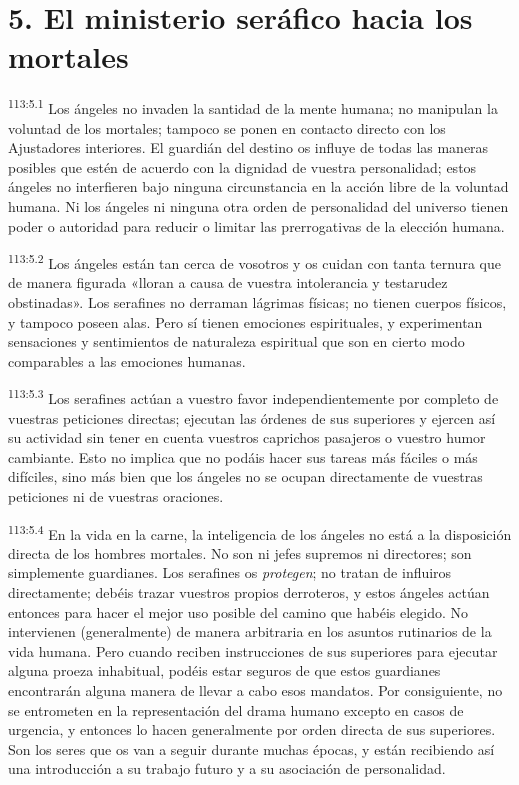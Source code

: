 \section*{5. El ministerio seráfico hacia los mortales}
\par
\textsuperscript{113:5.1} Los ángeles no invaden la santidad de la mente humana; no manipulan la voluntad de los mortales; tampoco se ponen en contacto directo con los Ajustadores interiores. El guardián del destino os influye de todas las maneras posibles que estén de acuerdo con la dignidad de vuestra personalidad; estos ángeles no interfieren bajo ninguna circunstancia en la acción libre de la voluntad humana. Ni los ángeles ni ninguna otra orden de personalidad del universo tienen poder o autoridad para reducir o limitar las prerrogativas de la elección humana.

\par
\textsuperscript{113:5.2} Los ángeles están tan cerca de vosotros y os cuidan con tanta ternura que de manera figurada «lloran a causa de vuestra intolerancia y testarudez obstinadas». Los serafines no derraman lágrimas físicas; no tienen cuerpos físicos, y tampoco poseen alas. Pero sí tienen emociones espirituales, y experimentan sensaciones y sentimientos de naturaleza espiritual que son en cierto modo comparables a las emociones humanas.

\par
\textsuperscript{113:5.3} Los serafines actúan a vuestro favor independientemente por completo de vuestras peticiones directas; ejecutan las órdenes de sus superiores y ejercen así su actividad sin tener en cuenta vuestros caprichos pasajeros o vuestro humor cambiante. Esto no implica que no podáis hacer sus tareas más fáciles o más difíciles, sino más bien que los ángeles no se ocupan directamente de vuestras peticiones ni de vuestras oraciones.

\par
\textsuperscript{113:5.4} En la vida en la carne, la inteligencia de los ángeles no está a la disposición directa de los hombres mortales. No son ni jefes supremos ni directores; son simplemente guardianes. Los serafines os \textit{protegen}; no tratan de influiros directamente; debéis trazar vuestros propios derroteros, y estos ángeles actúan entonces para hacer el mejor uso posible del camino que habéis elegido. No intervienen (generalmente) de manera arbitraria en los asuntos rutinarios de la vida humana. Pero cuando reciben instrucciones de sus superiores para ejecutar alguna proeza inhabitual, podéis estar seguros de que estos guardianes encontrarán alguna manera de llevar a cabo esos mandatos. Por consiguiente, no se entrometen en la representación del drama humano excepto en casos de urgencia, y entonces lo hacen generalmente por orden directa de sus superiores. Son los seres que os van a seguir durante muchas épocas, y están recibiendo así una introducción a su trabajo futuro y a su asociación de personalidad.

